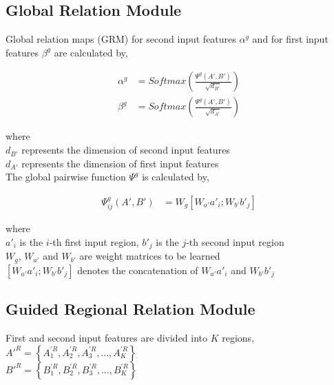 \documentclass{article}
\begin{document}
\subsection{Global Relation Module}

\noindent Global relation maps (GRM) for second input features $\alpha^{g}$ and for first input features $\beta^{g}$ are calculated by,

\begin{align}
\alpha^{g} &= Softmax\left(\frac{\Psi^{g}(A', B')}{\sqrt{d_{B'}}}\right) \\
\beta^{g} &= Softmax\left(\frac{\Psi^{g}(A', B')}{\sqrt{d_{A'}}}\right)
\end{align}

where \\

\indent\indent $d_{B'}$ represents the dimension of second input features \\
\indent\indent $d_{A'}$ represents the dimension of first input features \\

\noindent The global pairwise function $\Psi^{g}$ is calculated by,

\begin{align}
\Psi_{ij}^{g}(A', B') &= W_{g}[W_{a'}a'_{i}; W_{b'}b'_{j}] 
\end{align}

where \\

\indent\indent $a'_{i}$ is the $i$-th first input region, $b'_{j}$ is the $j$-th second input region \\ 
\indent\indent $W_{g}$, $W_{a'}$ and $W_{b'}$ are weight matrices to be learned \\ 
\indent\indent $[W_{a'}a'_{i}; W_{b'}b'_{j}]$ denotes the concatenation of $W_{a'}a'_{i}$ and $W_{b'}b'_{j}$ \\

\subsection{Guided Regional Relation Module}

\noindent First and second input features are divided into $K$ regions, \\

\indent\indent $A'^{R} = \left\{A_{1}^{'R}, A_{2}^{'R}, A_{3}^{'R}, ..., A_{K}^{'R}\right\}$ \\ 
\indent\indent $B'^{R} = \left\{B_{1}^{'R}, B_{2}^{'R}, B_{3}^{'R}, ..., B_{K}^{'R}\right\}$ \\ 
\end{document}

